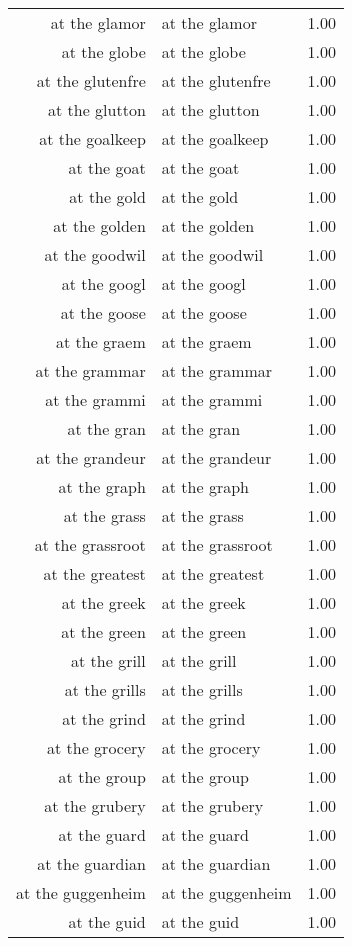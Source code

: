 \begin{table}[ht]
\begin{tabular}{rlr}
  at the glamor & at the glamor & 1.00 \\ 
  at the globe & at the globe & 1.00 \\ 
  at the glutenfre & at the glutenfre & 1.00 \\ 
  at the glutton & at the glutton & 1.00 \\ 
  at the goalkeep & at the goalkeep & 1.00 \\ 
  at the goat & at the goat & 1.00 \\ 
  at the gold & at the gold & 1.00 \\ 
  at the golden & at the golden & 1.00 \\ 
  at the goodwil & at the goodwil & 1.00 \\ 
  at the googl & at the googl & 1.00 \\ 
  at the goose & at the goose & 1.00 \\ 
  at the graem & at the graem & 1.00 \\ 
  at the grammar & at the grammar & 1.00 \\ 
  at the grammi & at the grammi & 1.00 \\ 
  at the gran & at the gran & 1.00 \\ 
  at the grandeur & at the grandeur & 1.00 \\ 
  at the graph & at the graph & 1.00 \\ 
  at the grass & at the grass & 1.00 \\ 
  at the grassroot & at the grassroot & 1.00 \\ 
  at the greatest & at the greatest & 1.00 \\ 
  at the greek & at the greek & 1.00 \\ 
  at the green & at the green & 1.00 \\ 
  at the grill & at the grill & 1.00 \\ 
  at the grills & at the grills & 1.00 \\ 
  at the grind & at the grind & 1.00 \\ 
  at the grocery & at the grocery & 1.00 \\ 
  at the group & at the group & 1.00 \\ 
  at the grubery & at the grubery & 1.00 \\ 
  at the guard & at the guard & 1.00 \\ 
  at the guardian & at the guardian & 1.00 \\ 
  at the guggenheim & at the guggenheim & 1.00 \\ 
  at the guid & at the guid & 1.00 \\ 

\end{tabular}
\end{table}

